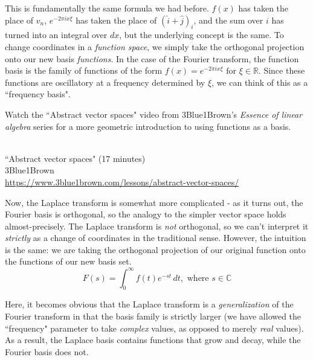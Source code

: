 This is fundamentally the same formula we had before. $f(x)$ has taken the place
of $v_n$, $e^{-2\pi ix \xi}$ has taken the place of $(\hat{i} + \hat{j})_i$, and
the sum over $i$ has turned into an integral over $dx$, but the underlying
concept is the same. To change coordinates in a \textit{function space}, we
simply take the orthogonal projection onto our new basis \textit{functions}. In
the case of the Fourier transform, the function basis is the family of functions
of the form $f(x) = e^{-2\pi ix \xi} \text{ for } \xi \in \mathbb{R}$. Since
these functions are oscillatory at a frequency determined by $\xi$, we can think
of this as a ``frequency basis".
\begin{remark}
  Watch the ``Abstract vector spaces" video from 3Blue1Brown's \textit{Essence
  of linear algebra} series for a more geometric introduction to using functions
  as a basis.
  \begin{bookfigure}
     \\
    ``Abstract vector spaces" (17 minutes) \\
    \footnotesize 3Blue1Brown \\
    \url{https://www.3blue1brown.com/lessons/abstract-vector-spaces/}
  \end{bookfigure}
\end{remark}

Now, the Laplace transform is somewhat more complicated - as it turns out, the
Fourier basis is orthogonal, so the analogy to the simpler vector space holds
almost-precisely. The Laplace transform is \textit{not} orthogonal, so we can't
interpret it \textit{strictly} as a change of coordinates in the traditional
sense. However, the intuition is the same: we are taking the orthogonal
projection of our original function onto the functions of our new basis set.
\begin{equation*}
  F(s) = \int_0^\infty f(t) e^{-st} \,dt, \text{ where } s \in \mathbb{C}
\end{equation*}

Here, it becomes obvious that the Laplace transform is a \textit{generalization}
of the Fourier transform in that the basis family is strictly larger (we have
allowed the ``frequency" parameter to take \textit{complex} values, as opposed
to merely \textit{real} values). As a result, the Laplace basis contains
functions that grow and decay, while the Fourier basis does not.
